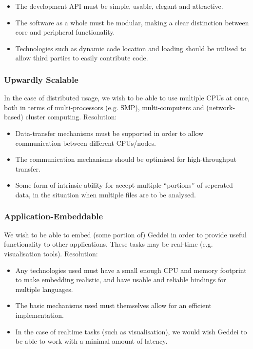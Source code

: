 \begin{itemize}
\item The development API must be simple, usable, elegant and attractive.
\item The software as a whole must be modular, making a clear distinction between core and peripheral functionality.
\item Technologies such as dynamic code location and loading should be utilised to allow third parties to easily contribute code.
\end{itemize}

\subsubsection{Upwardly Scalable}

In the case of distributed usage, we wish to be able to use multiple CPUs at once, both in terms of multi-processors (e.g. SMP), multi-computers and (network-based) cluster computing. Resolution:

\begin{itemize}
\item Data-transfer mechanisms must be supported in order to allow communication between different CPUs/nodes.
\item The communication mechanisms should be optimised for high-throughput transfer.
\item Some form of intrinsic ability for accept multiple ``portions'' of seperated data, in the situation when multiple files are to be analysed.
\end{itemize}

\subsubsection{Application-Embeddable}

We wish to be able to embed (some portion of) Geddei in order to provide useful functionality to other applications. These tasks may be real-time (e.g. visualisation tools). Resolution:

\begin{itemize}
\item Any technologies used must have a small enough CPU and memory footprint to make embedding realistic, and have usable and reliable bindings for multiple languages.
\item The basic mechanisms used must themselves allow for an efficient implementation.
\item In the case of realtime tasks (such as visualisation), we would wish Geddei to be able to work with a minimal amount of latency.
\end{itemize}

